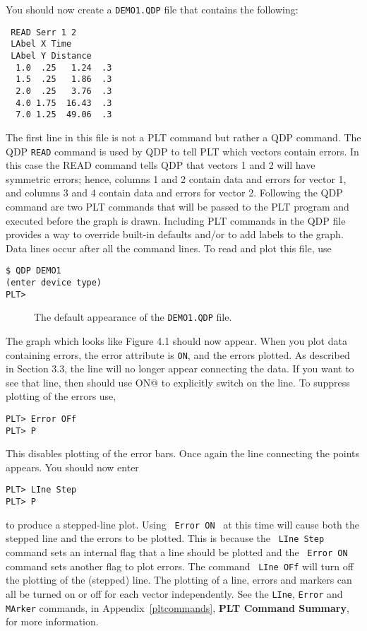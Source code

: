 You should now create a {\tt DEMO1.QDP} file that contains
the following:
\begin{verbatim}
 READ Serr 1 2
 LAbel X Time
 LAbel Y Distance
  1.0  .25   1.24  .3
  1.5  .25   1.86  .3
  2.0  .25   3.76  .3
  4.0 1.75  16.43  .3
  7.0 1.25  49.06  .3
\end{verbatim}
The first line in this file is not a PLT command but rather
a QDP command.
The QDP {\tt READ} command is used by QDP
to tell PLT which vectors contain errors.
In this case the READ command tells QDP that vectors 1 and 2
will have symmetric errors;
hence, columns 1 and 2 contain data and errors for vector 1,
and columns 3 and 4 contain data and errors for vector 2.
Following the QDP command are two PLT commands that will be passed
to the PLT program and executed before the graph is drawn.
Including PLT commands in the QDP file provides a way to override
built-in defaults and/or to add labels to the graph.
Data lines occur after all the command lines.
To read and plot this file, use
\begin{verbatim}
$ QDP DEMO1
(enter device type)
PLT>
\end{verbatim}
\begin{figure}
   \vspace{10.6cm}
   \caption{The default appearance of the {\tt DEMO1.QDP} file.}
\end{figure}
The graph which looks like Figure 4.1 should now appear.
When you plot data containing errors,
the error attribute is {\tt ON},
and the errors plotted.
As described in Section 3.3, the line will no longer appear
connecting the data.
If you want to see that line,
then should use \verb@LIne ON@ to explicitly switch on the line.
To suppress plotting of the errors use,
\begin{verbatim}
PLT> Error OFf
PLT> P
\end{verbatim}
This disables plotting of the error bars. 
Once again the line connecting the points appears.
You should now enter
\begin{verbatim}
PLT> LIne Step
PLT> P
\end{verbatim}
to produce a stepped-line plot.
Using \, {\tt Error~ON} \, at this time will cause
both the stepped line and the errors to be plotted.
This is because the \, {\tt LIne~Step} \, command sets an internal flag
that a line should be plotted
and the \, {\tt Error~ON} \, command sets another flag to plot errors.
The command \, {\tt LIne~OFf} will turn off the plotting of the (stepped) line.
The plotting of a line, errors and markers can all be turned on or off
for each vector independently.
See the {\tt LIne}, {\tt Error} and {\tt MArker} commands,
in Appendix~\ref{pltcommands}, {\bf PLT Command Summary},
for more information.

